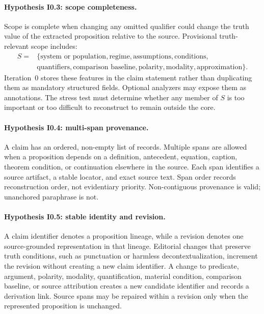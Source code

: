 \paragraph{Hypothesis I0.3: scope completeness.}
Scope is complete when changing any omitted qualifier could change the truth value of the extracted proposition relative to the source. Provisional truth-relevant scope includes:
\begin{align*}
S ={}& \{\text{system or population},\text{regime},\text{assumptions},\text{conditions},\\
     &\text{quantifiers},\text{comparison baseline},\text{polarity},\text{modality},\text{approximation}\}.
\end{align*}
Iteration~0 stores these features in the claim statement rather than duplicating them as mandatory structured fields. Optional analyzers may expose them as annotations. The stress test must determine whether any member of $S$ is too important or too difficult to reconstruct to remain outside the core.

\paragraph{Hypothesis I0.4: multi-span provenance.}
A claim has an ordered, non-empty list of \SourceSpan{} records. Multiple spans are allowed when a proposition depends on a definition, antecedent, equation, caption, theorem condition, or continuation elsewhere in the source. Each span identifies a source artifact, a stable locator, and exact source text. Span order records reconstruction order, not evidentiary priority. Non-contiguous provenance is valid; unanchored paraphrase is not.

\paragraph{Hypothesis I0.5: stable identity and revision.}
A claim identifier denotes a proposition lineage, while a revision denotes one source-grounded representation in that lineage. Editorial changes that preserve truth conditions, such as punctuation or harmless decontextualization, increment the revision without creating a new claim identifier. A change to predicate, argument, polarity, modality, quantification, material condition, comparison baseline, or source attribution creates a new candidate identifier and records a derivation link. Source spans may be repaired within a revision only when the represented proposition is unchanged.

